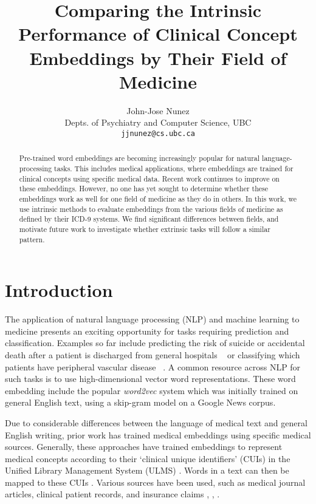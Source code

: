 \documentclass[11pt,a4paper]{article}
\title{Comparing the Intrinsic Performance of Clinical Concept Embeddings by Their Field of Medicine}
\author{John-Jose Nunez\\
  Depts. of Psychiatry and Computer Science, UBC\\
  {\tt jjnunez@cs.ubc.ca} 
}
\date{}
\begin{document}
\maketitle
\begin{abstract}
	Pre-trained word embeddings are becoming increasingly popular for natural language-processing tasks. This includes medical applications, where embeddings are trained for clinical concepts using specific medical data. Recent work continues to improve on these embeddings. However, no one has yet sought to determine whether these embeddings work as well for one field of medicine as they do in others. In this work, we use intrinsic methods to evaluate embeddings from the various fields of medicine as defined by their ICD-9 systems. We find significant differences between fields, and motivate future work to investigate whether extrinsic tasks will follow a similar pattern. 
\end{abstract}

\section{Introduction}


The application of natural language processing (NLP) and machine learning to medicine presents an exciting opportunity for tasks requiring prediction and classification. Examples so far include predicting the risk of suicide or accidental death after a patient is discharged from general hospitals ~\cite{mccoyImprovingPredictionSuicide2016} or classifying which patients have peripheral vascular disease ~\cite{afzalMiningPeripheralArterial2017}. A common resource across NLP for such tasks is to use high-dimensional vector word representations. These word embedding include the popular \emph{word2vec} system \cite{mikolovEfficientEstimationWord2013} which was initially trained on general English text, using a skip-gram model on a Google News corpus.

Due to considerable differences between the language of medical text and general English writing, prior work has trained medical embeddings using specific medical sources. Generally, these approaches have trained embeddings to represent medical concepts according to their `clinical unique identifiers' (CUIs) in the Unified Library Management System (ULMS) \cite{bodenreiderUnifiedMedicalLanguage2004}. Words in a text can then be mapped to these CUIs \cite{yuShortIntroductionNILE2013}. Various sources have been used, such as medical journal articles, clinical patient records, and insurance claims \cite{devineMedicalSemanticSimilarity2014}, \cite{minarro-gimenezExploringApplicationDeep2014},  \cite{choiLearningLowDimensionalRepresentations2016}.  
\end{document}
